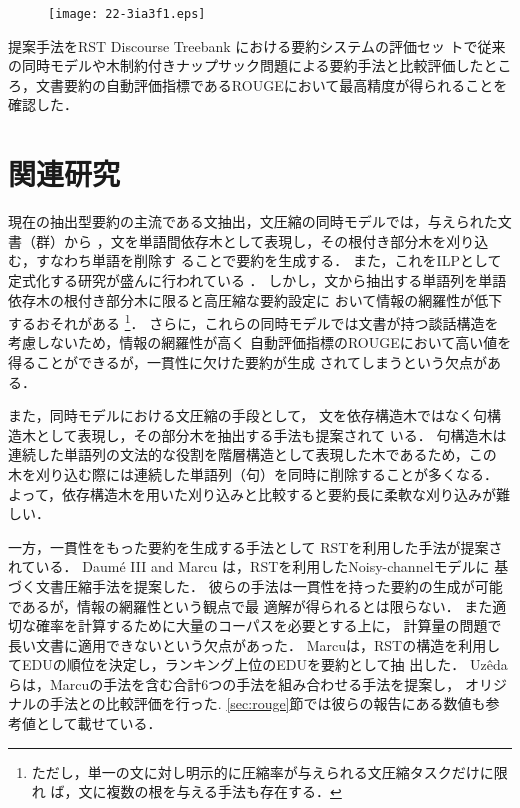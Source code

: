 \documentclass[japanese]{jnlp_1.4}
\begin{document}
\begin{figure}[t]
\begin{center}
\texttt{[image: 22-3ia3f1.eps]}
\end{center}
\label{fig:nested_tree}
\end{figure}

提案手法をRST Discourse Treebank \cite{carlson:01}における要約システムの評価セッ
トで従来の同時モデルや木制約付きナップサック問題による要約手法と比較評価したとこ
ろ，文書要約の自動評価指標であるROUGEにおいて最高精度が得られることを確認した．





\section{関連研究}

現在の抽出型要約の主流である文抽出，文圧縮の同時モデルでは，与えられた文書（群）から
，文を単語間依存木として表現し，その根付き部分木を刈り込む，すなわち単語を削除す
ることで要約を生成する．
また，これをILPとして定式化する研究が盛んに行われている
\cite{almeida:13,liu:13,morita:13,gillick:09}． 
しかし，文から抽出する単語列を単語依存木の根付き部分木に限ると高圧縮な要約設定に
おいて情報の網羅性が低下するおそれがある
\footnote{ただし，単一の文に対し明示的に圧縮率が与えられる文圧縮タスクだけに限れ
ば，文に複数の根を与える手法も存在する．}．
さらに，これらの同時モデルでは文書が持つ談話構造を考慮しないため，情報の網羅性が高く
自動評価指標のROUGEにおいて高い値を得ることができるが，一貫性に欠けた要約が生成
されてしまうという欠点がある．

また，同時モデルにおける文圧縮の手段として，
文を依存構造木ではなく句構造木として表現し，その部分木を抽出する手法も提案されて
いる\cite{li:14,lu:13,kirkpatrick:11}．
句構造木は連続した単語列の文法的な役割を階層構造として表現した木であるため，この
木を刈り込む際には連続した単語列（句）を同時に削除することが多くなる．
よって，依存構造木を用いた刈り込みと比較すると要約長に柔軟な刈り込みが難しい．


一方，一貫性をもった要約を生成する手法として RSTを利用した手法が提案されている．
Daum{\'e} III and Marcu
は，RSTを利用したNoisy-channelモデルに
基づく文書圧縮手法を提案した\cite{daume:02}．
彼らの手法は一貫性を持った要約の生成が可能であるが，情報の網羅性という観点で最
適解が得られるとは限らない．
また適切な確率を計算するために大量のコーパスを必要とする上に，
計算量の問題で長い文書に適用できないという欠点があった．
Marcuは，RSTの構造を利用してEDUの順位を決定し，ランキング上位のEDUを要約として抽
出した\cite{marcu:98}．
Uz\^{e}daらは，Marcuの手法を含む合計6つの手法を組み合わせる手法を提案し，
オリジナルの手法との比較評価を行った\cite{uzeda:10}.
\ref{sec:rouge}節では彼らの報告にある数値も参考値として載せている．
\end{document}
